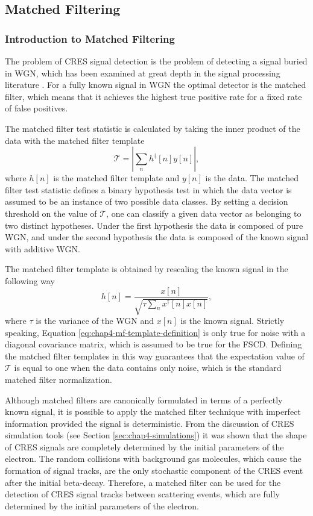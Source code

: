 \subsection{Matched Filtering}

\subsubsection*{Introduction to Matched Filtering}

The problem of CRES signal detection is the problem of detecting a signal buried in WGN, which has been examined at great depth in the signal processing literature \cite{detection_theory}. For a fully known signal in WGN the optimal detector is the matched filter, which means that it achieves the highest true positive rate for a fixed rate of false positives.

The matched filter test statistic is calculated by taking the inner product of the data with the matched filter template
\begin{equation}
    \mathcal{T}=\left|\sum_{n}{h^\dagger[n]y[n]}\right|,
    \label{eq:chap4-mf-test-stat-perfect}
\end{equation}
where $h[n]$ is the matched filter template and $y[n]$ is the data. The matched filter test statistic defines a binary hypothesis test in which the data vector is assumed to be an instance of two possible data classes. By setting a decision threshold on the value of $\mathcal{T}$, one can classify a given data vector as belonging to two distinct hypotheses. Under the first hypothesis the data is composed of pure WGN, and under the second hypothesis the data is composed of the known signal with additive WGN.

The matched filter template is obtained by rescaling the known signal in the following way
\begin{equation}
    h[n] = \frac{x[n]}{\sqrt{\tau \sum_{n}{x^\dagger[n]x[n]}}},
    \label{eq:chap4-mf-template-definition}
\end{equation}
where $\tau$ is the variance of the WGN and $x[n]$ is the known signal. Strictly speaking, Equation \ref{eq:chap4-mf-template-definition} is only true for noise with a diagonal covariance matrix, which is assumed to be true for the FSCD. Defining the matched filter templates in this way guarantees that the expectation value of $\mathcal{T}$ is equal to one when the data contains only noise, which is the standard matched filter normalization.

Although matched filters are canonically formulated in terms of a perfectly known signal, it is possible to apply the matched filter technique with imperfect information provided the signal is deterministic. From the discussion of CRES simulation tools (see Section \ref{sec:chap4-simulations}) it was shown that the shape of CRES signals are completely determined by the initial parameters of the electron. The random collisions with background gas molecules, which cause the formation of signal tracks, are the only stochastic component of the CRES event after the initial beta-decay. Therefore, a matched filter can be used for the detection of CRES signal tracks between scattering events, which are fully determined by the initial parameters of the electron.

